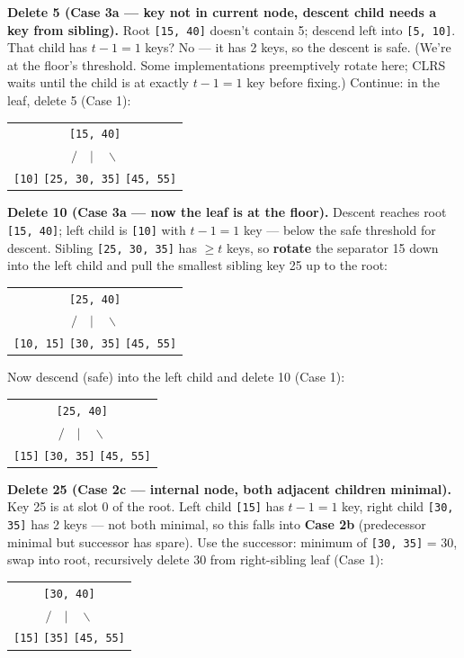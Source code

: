 \documentclass[11pt]{article}
\begin{document}
\begin{examplebox}
\textbf{Delete 5 (Case 3a --- key not in current node, descent child
needs a key from sibling).} Root \texttt{[15, 40]} doesn't contain 5;
descend left into \texttt{[5, 10]}. That child has $t - 1 = 1$ keys?
No --- it has 2 keys, so the descent is safe. (We're at the floor's
threshold. Some implementations preemptively rotate here; CLRS waits
until the child is at exactly $t - 1 = 1$ key before fixing.)
Continue: in the leaf, delete 5 (Case 1):
\begin{center}\begin{tabular}{c}
    \texttt{[15, 40]} \\
    $/ \quad | \quad \backslash$ \\
    \texttt{[10]} \quad \texttt{[25, 30, 35]} \quad \texttt{[45, 55]}
\end{tabular}\end{center}

\textbf{Delete 10 (Case 3a --- now the leaf is at the floor).}
Descent reaches root \texttt{[15, 40]}; left child is \texttt{[10]}
with $t - 1 = 1$ key --- below the safe threshold for descent.
Sibling \texttt{[25, 30, 35]} has $\ge t$ keys, so \textbf{rotate}
the separator 15 down into the left child and pull the smallest
sibling key 25 up to the root:
\begin{center}\begin{tabular}{c}
    \texttt{[25, 40]} \\
    $/ \quad | \quad \backslash$ \\
    \texttt{[10, 15]} \quad \texttt{[30, 35]} \quad \texttt{[45, 55]}
\end{tabular}\end{center}
Now descend (safe) into the left child and delete 10 (Case 1):
\begin{center}\begin{tabular}{c}
    \texttt{[25, 40]} \\
    $/ \quad | \quad \backslash$ \\
    \texttt{[15]} \quad \texttt{[30, 35]} \quad \texttt{[45, 55]}
\end{tabular}\end{center}

\textbf{Delete 25 (Case 2c --- internal node, both adjacent children
minimal).} Key 25 is at slot 0 of the root. Left child \texttt{[15]}
has $t - 1 = 1$ key, right child \texttt{[30, 35]} has 2 keys --- not
both minimal, so this falls into \textbf{Case 2b} (predecessor
minimal but successor has spare). Use the successor: minimum of
\texttt{[30, 35]} = 30, swap into root, recursively delete 30 from
right-sibling leaf (Case 1):
\begin{center}\begin{tabular}{c}
    \texttt{[30, 40]} \\
    $/ \quad | \quad \backslash$ \\
    \texttt{[15]} \quad \texttt{[35]} \quad \texttt{[45, 55]}
\end{tabular}\end{center}


\end{examplebox}
\end{document}
